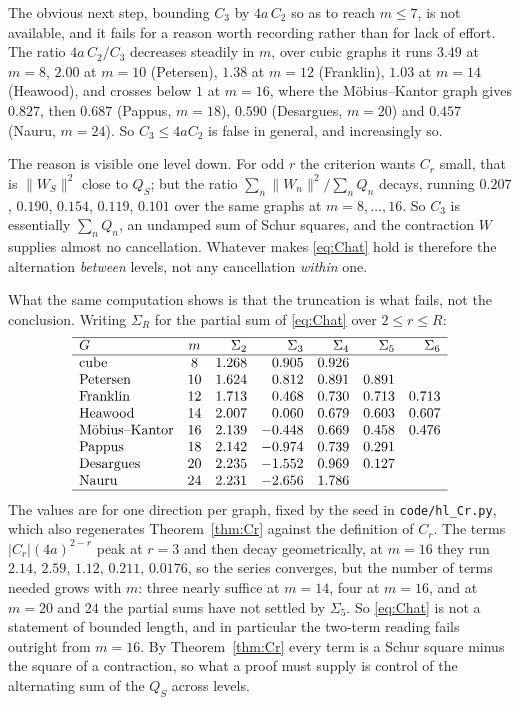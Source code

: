 \documentclass[11pt]{article}
\theoremstyle{remark}
\begin{document}
The obvious next step, bounding $C_3$ by $4a\,C_2$ so as to reach $m\le7$, is not
available, and it fails for a reason worth recording rather than for lack of effort. The
ratio $4a\,C_2/C_3$ decreases steadily in $m$, over cubic graphs it runs $3.49$ at
$m=8$, $2.00$ at $m=10$ (Petersen), $1.38$ at $m=12$ (Franklin), $1.03$ at $m=14$
(Heawood), and crosses below $1$ at $m=16$, where the M\"obius--Kantor graph gives
$0.827$, then $0.687$ (Pappus, $m=18$), $0.590$ (Desargues, $m=20$) and $0.457$ (Nauru,
$m=24$). So $C_3\le4aC_2$ is false in general, and increasingly so.

The reason is visible one level down. For odd $r$ the criterion wants $C_r$ small, that
is $\|W_S\|^2$ close to $Q_S$; but the ratio $\sum_n\|W_n\|^2/\sum_nQ_n$ decays, running
$0.207$, $0.190$, $0.154$, $0.119$, $0.101$ over the same graphs at $m=8,\dots,16$. So
$C_3$ is essentially $\sum_nQ_n$, an undamped sum of Schur squares, and the contraction
$W$ supplies almost no cancellation. Whatever makes \eqref{eq:Chat} hold is therefore the
alternation \emph{between} levels, not any cancellation \emph{within} one.

What the same computation shows is that the truncation is what fails, not the conclusion.
Writing $\Sigma_R$ for the partial sum of \eqref{eq:Chat} over $2\le r\le R$:
\[
\begin{array}{lcrrrrr}
\hline
G & m & \Sigma_2 & \Sigma_3 & \Sigma_4 & \Sigma_5 & \Sigma_6\\
\hline
\text{cube} & 8 & 1.268 & 0.905 & 0.926 & & \\
\text{Petersen} & 10 & 1.624 & 0.812 & 0.891 & 0.891 & \\
\text{Franklin} & 12 & 1.713 & 0.468 & 0.730 & 0.713 & 0.713\\
\text{Heawood} & 14 & 2.007 & 0.060 & 0.679 & 0.603 & 0.607\\
\text{M\"obius--Kantor} & 16 & 2.139 & -0.448 & 0.669 & 0.458 & 0.476\\
\text{Pappus} & 18 & 2.142 & -0.974 & 0.739 & 0.291 & \\
\text{Desargues} & 20 & 2.235 & -1.552 & 0.969 & 0.127 & \\
\text{Nauru} & 24 & 2.231 & -2.656 & 1.786 & & \\
\hline
\end{array}
\]
The values are for one direction per graph, fixed by the seed in
\texttt{code/hl\_Cr.py}, which also regenerates Theorem~\ref{thm:Cr} against the
definition of $C_r$. The terms $|C_r|(4a)^{2-r}$ peak at $r=3$ and then decay
geometrically, at $m=16$ they run
$2.14,\,2.59,\,1.12,\,0.211,\,0.0176$, so the series converges, but the number of
terms needed grows with $m$: three nearly suffice at $m=14$, four at $m=16$, and at
$m=20$ and $24$ the partial sums have not settled by $\Sigma_5$. So \eqref{eq:Chat} is
not a statement of bounded length, and in particular the two-term reading fails outright
from $m=16$. By Theorem~\ref{thm:Cr} every term is a Schur square minus the square of a
contraction, so what a proof must supply is control of the alternating sum of the $Q_S$
across levels.
\end{document}
